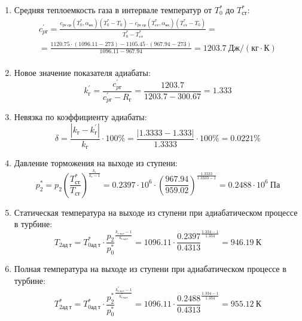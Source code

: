 \documentclass[a4paper,12pt]{article}
\begin{document}
\begin{enumerate}
        \item Средняя теплоемкость газа в интервале температур от $T_0^*$ до $T_{ст}^*$:
        \begin{gather*}
            c_{pг}^\prime = \frac{
		        c_{pг\ ср} (T_0^*, \alpha_{вх}) (T_0^* - T_0) - c_{pг\ ср} (T_{ст}^*, \alpha_{вх})(T_{ст}^* - T_0)
		    }{
		        T_0^* - T_{ст}^*} =\\
            =\frac{
		        1120.75 \cdot
                (1096.11 - 273) -
		        1105.45 \cdot
                (967.94 - 273)
		    }{
		        1096.11 - 967.94} =
		    1203.7 \ Дж / (кг \cdot К)\\
        \end{gather*}

        \item Новое значение показателя адиабаты:
        \[
            k_г^\prime = \frac{c_{pг}^\prime}{c_{pг}^\prime - R_г} =
                \frac{
                    1203.7
                }{
                    1203.7 - 300.67
                }
            = 1.333
        \]

        \item Невязка по коэффициенту адиабаты:
        \[
            \delta = \frac{ \left| k_г - k_г^\prime \right| }{ k_г } \cdot 100 \%=
                \frac{
                    \left| 1.3333 - 1.333 \right|
                }{
                    1.3333
                } \cdot 100 \% =
            0.0221 \%
        \]

        \item Давление торможения на выходе из ступени:
        \[
            p_2^* = p_2 \left(
                            \frac{ T_{ст}^* }{ T_{ст} }
                    \right) ^ \frac{ k_г }{ k_г - 1 } =
                 0.2397 \cdot 10^6 \cdot \left(
                            \frac{ 967.94 }{ 959.02 }
                    \right) ^
                \frac{ 1.3333 }{ 1.3333 - 1 } =
            0.2488 \cdot 10^6 \ Па
        \]

        \item Статическая температура на выходе из ступени при адиабатическом процессе в турбине:
        \[
            T_{2ад\ т} = T_{0ад\ т}^* \cdot \frac{p_2}{p_0^*} ^ {
                    \frac{k_{г\ ад\ т} - 1}{k_{г\ ад\ т} }
            } = 1096.11 \cdot
            \frac{ 0.2397
            }{
            0.4313
            } ^ {
                    \frac{1.334 - 1}{1.334}
            } =
            946.19\ К
        \]

        \item Полная температура на выходе из ступени при адиабатическом процессе в турбине:
        \[
            T_{2ад\ т}^* = T_{0ад\ т}^* \cdot \frac{p_2^*}{p_0^*} ^ {
                    \frac{k_{г\ ад\ т}^* - 1}{k_{г\ ад\ т}^*}
            } = 1096.11 \cdot
            \frac{ 0.2488
            }{
            0.4313
            } ^ {
                    \frac{1.334 - 1}{1.334}
            } =
            955.12\ К
        \]


\end{enumerate}
\end{document}
